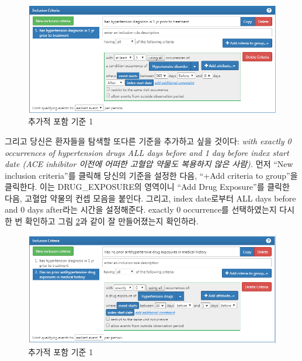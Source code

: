 \documentclass[11pt]{book}
\theoremstyle{definition}
\theoremstyle{definition}
\theoremstyle{definition}
\theoremstyle{remark}
\begin{document}
\begin{figure}

{\centering \includegraphics[width=1\linewidth]{images/Cohorts/ATLAS-IC1} 

}

\caption{추가적 포함 기준 1}\label{fig:ATLASIC1}
\end{figure}

그리고 당신은 환자들을 탐색할 또다른 기준을 추가하고 싶을 것이다:
\emph{with exactly 0 occurrences of hypertension drugs ALL days before
and 1 day before index start date (ACE inhibitor 이전에 어떠한 고혈압
약물도 복용하지 않은 사람).} 먼저 ``New inclusion criteria''를 클릭해
당신의 기준을 설정한 다음, ``+Add criteria to group''을 클릭한다. 이는
DRUG\_EXPOSURE의 영역이니 ``Add Drug Exposure''를 클릭한 다음, 고혈압
약물의 컨셉 모음을 붙인다. 그리고, index date로부터 ALL days before and
0 days after라는 시간을 설정해준다. exactly 0 occurrence를 선택하였는지
다시 한 번 확인하고 그림 \ref{fig:ATLASIC2}과 같이 잘 만들어졌는지
확인하라.

\begin{figure}

{\centering \includegraphics[width=1\linewidth]{images/Cohorts/ATLAS-IC2} 

}

\caption{추가적 포함 기준 1}\label{fig:ATLASIC2}
\end{figure}
\end{document}
